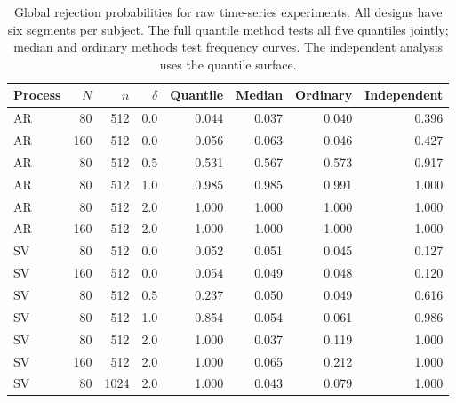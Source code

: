 \begin{table}[htbp]
\centering
\caption{Global rejection probabilities for raw time-series experiments. All designs have six segments per subject. The full quantile method tests all five quantiles jointly; median and ordinary methods test frequency curves. The independent analysis uses the quantile surface.}\label{tab:raw}
\small
\begin{tabular}{lrrrrrrr}
\toprule
Process & $N$ & $n$ & $\delta$ & Quantile & Median & Ordinary & Independent \\
\midrule
AR & 80 & 512 & 0.0 & 0.044 & 0.037 & 0.040 & 0.396 \\
AR & 160 & 512 & 0.0 & 0.056 & 0.063 & 0.046 & 0.427 \\
AR & 80 & 512 & 0.5 & 0.531 & 0.567 & 0.573 & 0.917 \\
AR & 80 & 512 & 1.0 & 0.985 & 0.985 & 0.991 & 1.000 \\
AR & 80 & 512 & 2.0 & 1.000 & 1.000 & 1.000 & 1.000 \\
AR & 160 & 512 & 2.0 & 1.000 & 1.000 & 1.000 & 1.000 \\
SV & 80 & 512 & 0.0 & 0.052 & 0.051 & 0.045 & 0.127 \\
SV & 160 & 512 & 0.0 & 0.054 & 0.049 & 0.048 & 0.120 \\
SV & 80 & 512 & 0.5 & 0.237 & 0.050 & 0.049 & 0.616 \\
SV & 80 & 512 & 1.0 & 0.854 & 0.054 & 0.061 & 0.986 \\
SV & 80 & 512 & 2.0 & 1.000 & 0.037 & 0.119 & 1.000 \\
SV & 160 & 512 & 2.0 & 1.000 & 0.065 & 0.212 & 1.000 \\
SV & 80 & 1024 & 2.0 & 1.000 & 0.043 & 0.079 & 1.000 \\
\bottomrule
\end{tabular}
\end{table}
